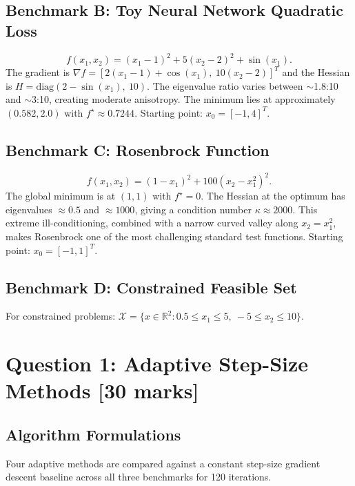 \documentclass[11pt,a4paper]{article}
\begin{document}
\subsection{Benchmark B: Toy Neural Network Quadratic Loss}
\begin{equation}
f(x_1, x_2) = (x_1 - 1)^2 + 5(x_2 - 2)^2 + \sin(x_1).
\end{equation}
The gradient is $\nabla f = [2(x_1 - 1) + \cos(x_1),\ 10(x_2 - 2)]^T$ and the Hessian is $H = \text{diag}(2 - \sin(x_1),\ 10)$. The eigenvalue ratio varies between $\sim$1.8:10 and $\sim$3:10, creating moderate anisotropy. The minimum lies at approximately $(0.582, 2.0)$ with $f^{\star} \approx 0.7244$. Starting point: $x_0 = [-1, 4]^T$.

\subsection{Benchmark C: Rosenbrock Function}
\begin{equation}
f(x_1, x_2) = (1 - x_1)^2 + 100(x_2 - x_1^2)^2.
\end{equation}
The global minimum is at $(1, 1)$ with $f^{\star} = 0$. The Hessian at the optimum has eigenvalues $\approx 0.5$ and $\approx 1000$, giving a condition number $\kappa \approx 2000$. This extreme ill-conditioning, combined with a narrow curved valley along $x_2 = x_1^2$, makes Rosenbrock one of the most challenging standard test functions. Starting point: $x_0 = [-1, 1]^T$.

\subsection{Benchmark D: Constrained Feasible Set}
For constrained problems: $\mathcal{X} = \{x \in \mathbb{R}^2 : 0.5 \leq x_1 \leq 5,\ -5 \leq x_2 \leq 10\}$.

\section{Question 1: Adaptive Step-Size Methods \hfill [30 marks]}
\label{sec:q1}

\subsection{Algorithm Formulations}

Four adaptive methods are compared against a constant step-size gradient descent baseline across all three benchmarks for 120 iterations.
\end{document}
